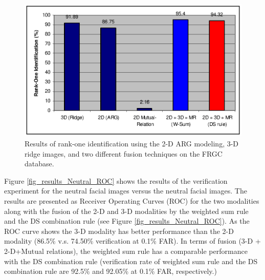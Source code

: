 {\begin{figure}[tbp]
\begin{center}
\includegraphics[scale = .6]{./chapters/figures/rank_one_chart_FRGC.eps}
\caption{Results of rank-one identification using the 2-D ARG
modeling, 3-D ridge images, and two different fusion techniques on
the FRGC database.}\label{fig_rank_one_FRGC}
\end{center}
\end{figure}

Figure \ref{fig_results_Neutral_ROC} shows the results of the
verification experiment for the neutral facial images versus the
neutral facial images. The results are presented as Receiver
Operating Curves (ROC) for the two modalities along with the fusion
of the 2-D and 3-D modalities by the weighted sum rule and the DS
combination rule (see Figure \ref{fig_results_Neutral_ROC}). As the
ROC curve shows the 3-D modality has better performance than the 2-D
modality (86.5\% v.s. 74.50\% verification at 0.1\% FAR). In terms
of fusion (3-D + 2-D+Mutual relations), the weighted sum rule has a
comparable performance with the DS combination rule (verification
rate of weighted sum rule and the DS combination rule are 92.5\% and
92.05\% at 0.1\% FAR, respectively.)

}
